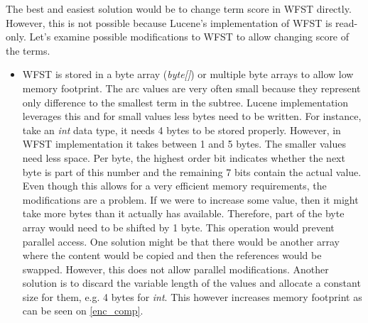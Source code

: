 The best and easiest solution would be to change term score in WFST directly. However, this is not possible because
Lucene's implementation of WFST is read-only. Let's examine possible modifications to WFST to allow changing score of the
terms.
\begin{itemize}
    \item WFST is stored in a byte array (\textit{byte[]}) or multiple byte arrays to allow low memory footprint. The
    arc values are very often small because they represent only difference to the smallest term in the subtree. Lucene
    implementation leverages this and for small values less bytes need to be written. For instance, take an \textit{int}
    data type, it needs 4 bytes to be stored properly. However, in WFST implementation it takes between 1 and 5 bytes.
    The smaller values need less space. Per byte, the highest order bit indicates whether the next byte is part of this
    number and the remaining 7 bits contain the actual value. Even though this allows for a very efficient memory requirements,
    the modifications are a problem. If we were to increase some value, then it might take more bytes than it actually has available.
    Therefore, part of the byte array would need to be shifted by 1 byte. This operation would prevent parallel access.
    One solution might be that there would be another array where the content would be copied and then the references
    would be swapped. However, this does not allow parallel modifications.
    Another solution is to discard the variable length of the values and allocate a constant size for them,
    e.g. 4 bytes for \textit{int}. This however increases memory footprint as can be seen on \ref{enc_comp}.

    \begin{figure}[htbp]
        \centering
\end{figure}
\end{itemize}
